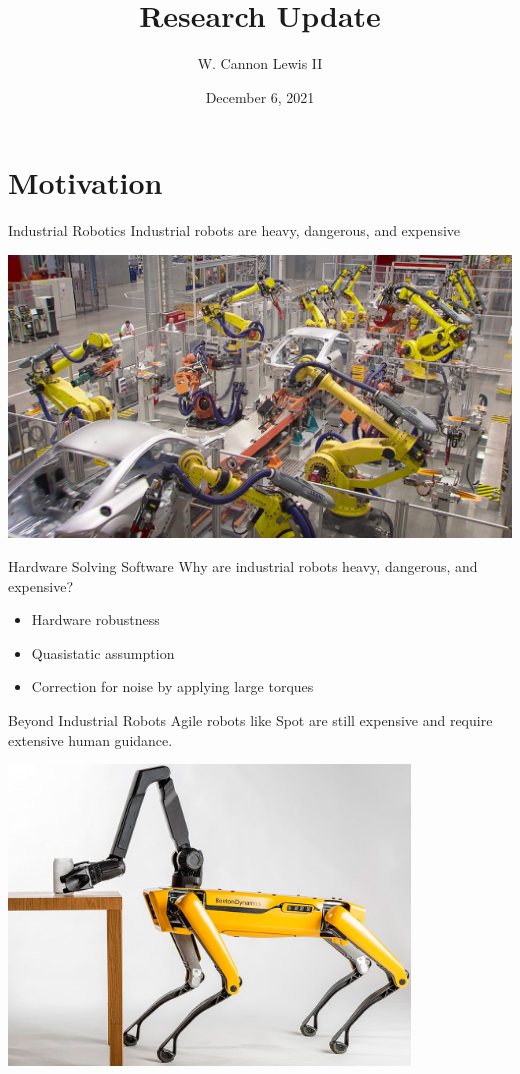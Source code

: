 \documentclass{beamer}
\title{Research Update}
\author{W. Cannon Lewis II}
\date{December 6, 2021}
\begin{document}
\begin{frame}
  \titlepage
\end{frame}

\section{Motivation}

\begin{frame}{Industrial Robotics}
  Industrial robots are heavy, dangerous, and expensive

  \includegraphics[keepaspectratio,width=\textwidth]{assets/factory_robots}
\end{frame}

\begin{frame}{Hardware Solving Software}
  Why are industrial robots heavy, dangerous, and expensive? 
  \begin{itemize}
    \item Hardware robustness
    \item Quasistatic assumption
    \item Correction for noise by applying large torques
  \end{itemize}
\end{frame}

\begin{frame}{Beyond Industrial Robots}
  Agile robots like Spot are still expensive and require extensive human guidance.

  \begin{center}
    \includegraphics[keepaspectratio,width=0.8\textwidth]{assets/spotmini}
  \end{center}
\end{frame}
\end{document}
